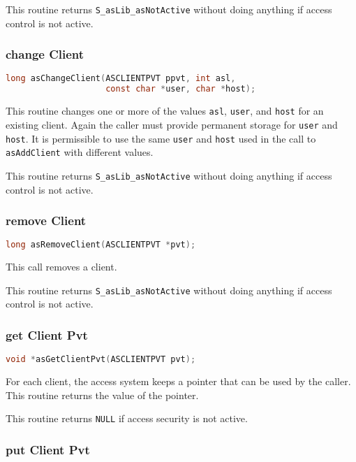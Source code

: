 This routine returns \verb|S_asLib_asNotActive| without doing anything if access control is not active.

\subsubsection{change Client}

\begin{lstlisting}[language=C]
long asChangeClient(ASCLIENTPVT ppvt, int asl,
                    const char *user, char *host);
\end{lstlisting}

This routine changes one or more of the values \verb|asl|, \verb|user|, and \verb|host| for an existing client.
Again the caller must provide permanent storage for \verb|user| and \verb|host|.
It is permissible to use the same \verb|user| and \verb|host| used in the call to \verb|asAddClient| with different values.

This routine returns \verb|S_asLib_asNotActive| without doing anything if access control is not active.

\subsubsection{remove Client}

\begin{lstlisting}[language=C]
long asRemoveClient(ASCLIENTPVT *pvt);
\end{lstlisting}

This call removes a client.

This routine returns \verb|S_asLib_asNotActive| without doing anything if access control is not active.

\subsubsection{get Client Pvt}

\begin{lstlisting}[language=C]
void *asGetClientPvt(ASCLIENTPVT pvt); 
\end{lstlisting}

For each client, the access system keeps a pointer that can be used by the caller.
This routine returns the value of the pointer.

This routine returns \verb|NULL| if access security is not active.

\subsubsection{put Client Pvt}

